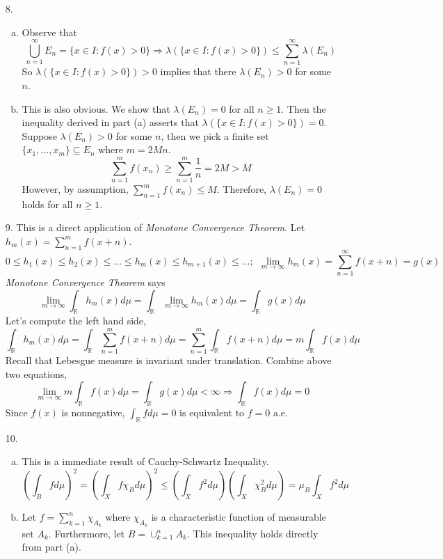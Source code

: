 \begin{itemize}
		\item[8.] 
		\begin{enumerate}[(a)]
			\item Observe that 
			$$
			\bigcup_{n=1}^\infty E_n = \{x\in I: f(x) > 0\} \Rightarrow \lambda(\{x\in I: f(x) > 0\}) \le \sum_{n=1}^\infty \lambda(E_n)
			$$
			So $\lambda(\{x\in I: f(x) > 0\}) > 0$ implies that there $\lambda(E_n)>0$ for some $n$.
			
			\item This is also obvious. We show that $\lambda(E_n) = 0$ for all $n\ge 1$. Then the inequality derived in part (a) asserts that $\lambda(\{x\in I: f(x) > 0\}) = 0$. Suppose $\lambda(E_n) > 0$ for some $n$, then we pick a finite set $\{x_1,\ldots, x_m\}\subseteq E_n$ where $m = 2Mn$. 
			$$
			\sum_{n=1}^m f(x_n) \ge \sum_{n=1}^m \frac{1}{n} = 2M > M
			$$ 
			However, by assumption, $\sum_{n=1}^m f(x_n) \le M$. Therefore, $\lambda(E_n) = 0$ holds for all $n\ge 1$.
		\end{enumerate}
		
		
		\item[9.] This is a direct application of \textit{Monotone Convergence Theorem}. Let $h_m(x) = \sum_{n=1}^m f(x+n)$. 
		$$
		0\le h_1(x)\le h_2(x) \le \ldots \le h_m(x)\le h_{m+1}(x)\le \ldots;~~\lim_{m\rightarrow \infty} h_m(x) = \sum_{n=1}^\infty f(x+n) = g(x)
		$$
		\textit{Monotone Convergence Theorem} says
		$$
		\lim_{m\rightarrow \infty} \int_\mathbb{R} h_m(x) d\mu= \int_{\mathbb{R}} \lim_{m\rightarrow \infty} h_m(x) d\mu= \int_{\mathbb{R}} g(x) d\mu
		$$
		Let's compute the left hand side,
		$$
		\int_{\mathbb{R}} h_m(x) d\mu = \int_{\mathbb{R}} \sum_{n=1}^m f(x+n) d\mu = \sum_{n=1}^m \int_{\mathbb{R}} f(x+n)d\mu = m\int_{\mathbb{R}} f(x) d\mu 
		$$
		Recall that Lebesgue measure is invariant under translation. Combine above two equations, 
		$$
		\lim_{m\rightarrow \infty} m\int_{\mathbb{R}}f(x)d\mu = \int_{\mathbb{R}} g(x)d\mu < \infty \Rightarrow \int_{\mathbb{R}} f(x) d\mu=0
		$$
		Since $f(x)$ is nonnegative, $\int_{\mathbb{R}}f d\mu = 0$ is equivalent to $f=0$ a.e.
		
		\item[10.] \begin{enumerate}[(a)]
			\item This is a immediate result of Cauchy-Schwartz Inequality.
			$$
			\left(\int_B f d\mu\right)^2 = \left(\int_X f\chi_B d\mu\right)^2 \le \left(\int_X f^2d\mu  \right)\left(\int_X \chi_B^2d\mu \right) = \mu_B \int_X f^2d\mu 
			$$
			
			\item Let $f = \sum_{k=1}^n \chi_{A_k}$ where $\chi_{A_k}$ is a characteristic function of measurable set $A_k$. Furthermore, let $B =\cup_{k=1}^nA_k$. This inequality holds directly from part (a). 
		\end{enumerate}
\end{itemize}
